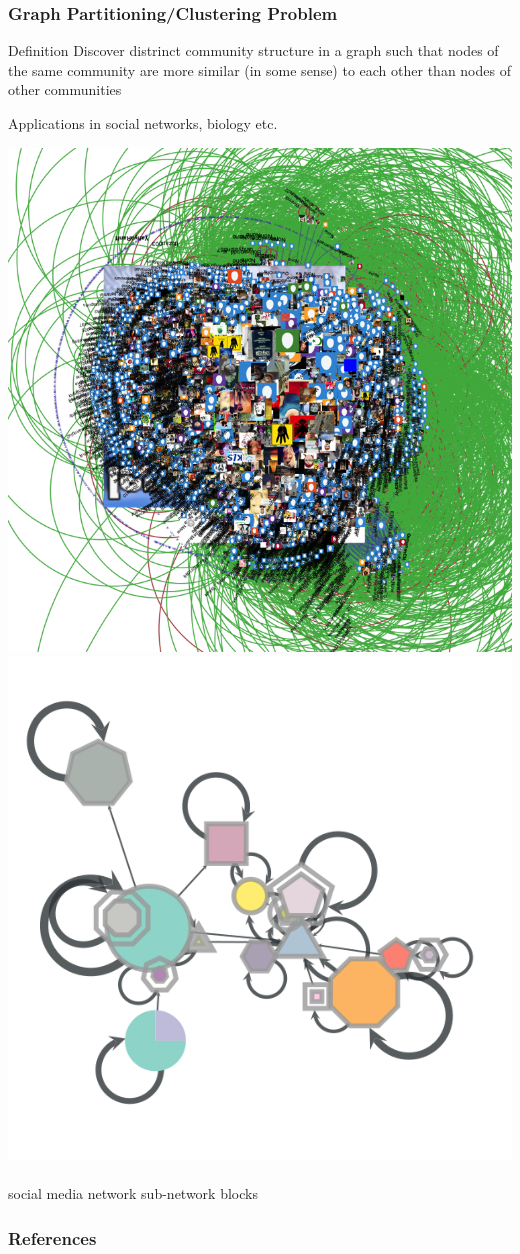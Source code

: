 \documentclass[titlepage,german,presentation]{beamer}
\begin{document}
\begin{frame}
\frametitle{Graph Partitioning/Clustering Problem}

\begin{block}{Definition}
  Discover distrinct community structure in a graph
  such that nodes of the same community are more similar
  (in some sense) to each other than nodes of other
  communities
\end{block}

Applications in social networks, biology etc.\\

\begin{center}
\includegraphics[height=0.22\textwidth]{./ch/1476395085.png}\qquad
\includegraphics[height=0.22\textwidth]{./ch/1476395079.png}
~\\
social media network \qquad sub-network blocks
\end{center}

\end{frame}

\begin{frame}[allowframebreaks]
        \frametitle{References}
        
        
\end{frame}




\end{document}
